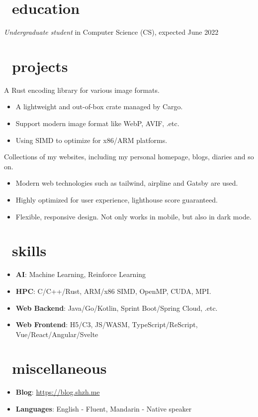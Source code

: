 \documentclass{common}
\begin{document}


\section{\faGraduationCap\ education}
\textit{Undergraduate student} in Computer Science (CS), expected June 2022

\section{\faCubes\ projects}
A Rust encoding library for various image formats.
\begin{itemize}
  \item A lightweight and out-of-box crate managed by Cargo.
  \item Support modern image format like WebP, AVIF, .etc.
  \item Using SIMD to optimize for x86/ARM platforms.
\end{itemize}
Collections of my websites, including my personal homepage, blogs, diaries and so on.
\begin{itemize}
  \item Modern web technologies such as tailwind, airpline and Gatsby are used.
  \item Highly optimized for user experience, lighthouse score guaranteed.
  \item Flexible, responsive design. Not only works in mobile, but also in dark mode.
\end{itemize}

\section{\faCogs\ skills}
\begin{itemize}[parsep=0.5ex]
  \item \textbf{AI}: Machine Learning, Reinforce Learning
  \item \textbf{HPC}: C/C++/Rust, ARM/x86 SIMD, OpenMP, CUDA, MPI.
  \item \textbf{Web Backend}: Java/Go/Kotlin, Sprint Boot/Spring Cloud, .etc.
  \item \textbf{Web Frontend}: H5/C3, JS/WASM, TypeScript/ReScript, Vue/React/Angular/Svelte
\end{itemize}

\section{\faInfo\ miscellaneous}
\begin{itemize}[parsep=0.5ex]
  \item \textbf{Blog}: \href{https://blog.shzh.me}{https://blog.shzh.me}
  \item \textbf{Languages}: English - Fluent, Mandarin - Native speaker
\end{itemize}
\end{document}
